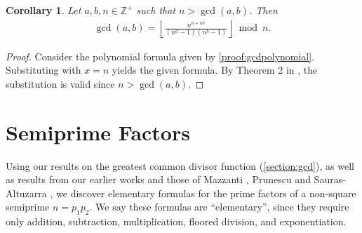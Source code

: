 \documentclass[11pt,reqno]{article}
\theoremstyle{plain}
\newtheorem{corollary}[theorem]{Corollary}
\theoremstyle{definition}
\newcommand{\floor}[1]{\left\lfloor #1 \right\rfloor}
\newcommand{\Z}{\mathbb{Z}}
\begin{document}
\begin{corollary} \label{proof:gcdintegerbase}
Let $a,b,n \in \Z^+$ such that $n > \gcd(a,b)$. Then
\begin{align*}
\gcd(a,b) = \floor{\frac{n^{a+ab}}{(n^a-1)(n^b-1)}}\bmod n .
\end{align*}
\end{corollary}
\begin{proof}
Consider the polynomial formula given by \cref{proof:gcdpolynomial}. Substituting with $x = n$ yields the given formula. By Theorem 2 in  \cite{shunia2024polynomial}, the substitution is valid since $n > \gcd(a,b)$.
\end{proof}

\section{Semiprime Factors} \label{section:semiprimes}
Using our results on the greatest common divisor function (\cref{section:gcd}), as well as results from our earlier works \cite{shunia2023simple,shunia2024polynomial} and those of Mazzanti \cite{mazzanti2002plainbases}, Prunescu and Sauras-Altuzarra \cite{prunescu2024factorial}, we discover elementary formulas for the prime factors of a non-square semiprime $n=p_1 p_2$. We say these formulas are ``elementary'', since they require only addition, subtraction, multiplication, floored division, and exponentiation.
\end{document}
